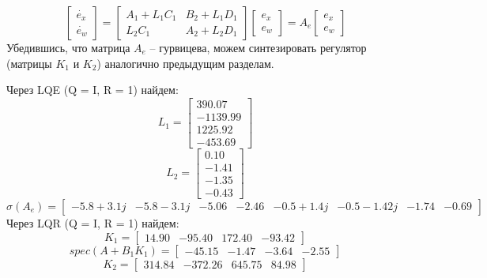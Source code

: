 \[
    \begin{bmatrix}
        \dot{e_x} \\
        \dot{e_w}
    \end{bmatrix} = 
    \begin{bmatrix}
        A_1 + L_1C_1 & B_2 + L_1D_1 \\
        L_2C_1 & A_2 + L_2D_1
    \end{bmatrix}
    \begin{bmatrix}
        e_x \\
        e_w
    \end{bmatrix} = A_e 
    \begin{bmatrix}
        e_x \\
        e_w
    \end{bmatrix}
\] 
Убедившись, что матрица \(A_e\) -- гурвицева, можем синтезировать регулятор (матрицы $K_1$ и $K_2$) аналогично предыдущим разделам.

Через LQE (Q = I, R = 1) найдем:
\[L_1 = \begin{bmatrix}
    390.07\\
   -1139.99\\
    1225.92\\
   -453.69
  \end{bmatrix}\]
  \[L_2 = \begin{bmatrix}
    0.10\\
   -1.41\\
   -1.35\\
   -0.43
  \end{bmatrix}\]
  \[\sigma (A_e) = \begin{bmatrix}
    -5.8 + 3.1j & -5.8 -3.1j & -5.06  & -2.46  & -0.5 + 1.4j & -0.5 -1.42j & -1.74  & -0.69 
   \end{bmatrix}\]
Через LQR (Q = I, R = 1) найдем:
   \[K_1 = \begin{bmatrix}
    14.90 & -95.40 &  172.40 & -93.42
  \end{bmatrix}\]
  \[spec(A + B_1 K_1) = \begin{bmatrix}
   -45.15 & -1.47 & -3.64 & -2.55
  \end{bmatrix}\]
  \[K_2 = \begin{bmatrix}
    314.84 & -372.26 &  645.75 &  84.98
  \end{bmatrix}\]


